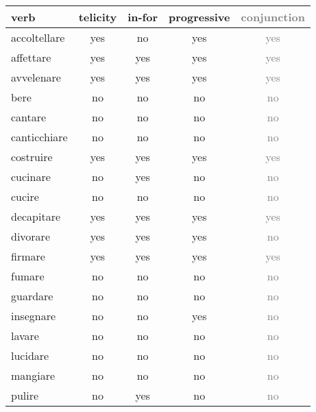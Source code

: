 \begin{longtable}{lc|ccc}
\textbf{verb} & \textbf{telicity} & \textbf{in-for} & \textbf{progressive} & \textbf{\textcolor{gray}{conjunction}}\\
\hline
\endhead
accoltellare   & yes      & no     & yes         & 	\textcolor{gray}{yes}         \\
affettare      & yes      & yes    & yes         & 	\textcolor{gray}{yes}         \\
avvelenare     & yes      & yes    & yes         & 	\textcolor{gray}{yes}         \\
bere           & no       & no     & no          & 	\textcolor{gray}{no}          \\
cantare        & no       & no     & no          & 	\textcolor{gray}{no}          \\
canticchiare   & no       & no     & no          & 	\textcolor{gray}{no}          \\
costruire      & yes      & yes    & yes         & 	\textcolor{gray}{yes}         \\
cucinare       & no       & yes    & no          & 	\textcolor{gray}{no}          \\
cucire         & no       & no     & no          & 	\textcolor{gray}{no}          \\
decapitare     & yes      & yes    & yes         & 	\textcolor{gray}{yes}         \\
divorare       & yes      & yes    & yes         & 	\textcolor{gray}{no}          \\
firmare        & yes      & yes    & yes         & 	\textcolor{gray}{yes}         \\
fumare         & no       & no     & no          & 	\textcolor{gray}{no}          \\
guardare       & no       & no     & no          & 	\textcolor{gray}{no}          \\
insegnare      & no       & no     & yes         & 	\textcolor{gray}{no}          \\
lavare         & no       & no     & no          & 	\textcolor{gray}{no}          \\
lucidare       & no       & no     & no          & 	\textcolor{gray}{no}          \\
mangiare       & no       & no     & no          & 	\textcolor{gray}{no}          \\
pulire         & no       & yes    & no          & 	\textcolor{gray}{no}          \\

\end{longtable}
